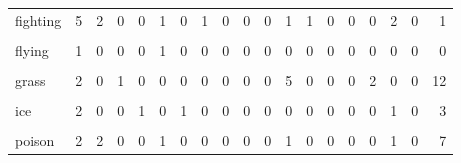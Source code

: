 \documentclass[
  12pt,
]{extreport}
\begin{document}
\begin{table}[H]
\begin{tabular}[t]{lrrrrrrrrrrrrrrrrrr}
\addlinespace
fighting & 5 & 2 & 0 & 0 & 1 & 0 & 1 & 0 & 0 & 0 & 1 & 1 & 0 & 0 & 0 & 2 & 0 & 1\\
\cellcolor{gray!10}{fire} & \cellcolor{gray!10}{1} & \cellcolor{gray!10}{0} & \cellcolor{gray!10}{0} & \cellcolor{gray!10}{1} & \cellcolor{gray!10}{1} & \cellcolor{gray!10}{0} & \cellcolor{gray!10}{2} & \cellcolor{gray!10}{1} & \cellcolor{gray!10}{0} & \cellcolor{gray!10}{0} & \cellcolor{gray!10}{1} & \cellcolor{gray!10}{0} & \cellcolor{gray!10}{0} & \cellcolor{gray!10}{0} & \cellcolor{gray!10}{0} & \cellcolor{gray!10}{0} & \cellcolor{gray!10}{0} & \cellcolor{gray!10}{13}\\
flying & 1 & 0 & 0 & 0 & 1 & 0 & 0 & 0 & 0 & 0 & 0 & 0 & 0 & 0 & 0 & 0 & 0 & 0\\
\cellcolor{gray!10}{ghost} & \cellcolor{gray!10}{1} & \cellcolor{gray!10}{0} & \cellcolor{gray!10}{0} & \cellcolor{gray!10}{0} & \cellcolor{gray!10}{1} & \cellcolor{gray!10}{0} & \cellcolor{gray!10}{0} & \cellcolor{gray!10}{0} & \cellcolor{gray!10}{0} & \cellcolor{gray!10}{0} & \cellcolor{gray!10}{1} & \cellcolor{gray!10}{0} & \cellcolor{gray!10}{0} & \cellcolor{gray!10}{0} & \cellcolor{gray!10}{0} & \cellcolor{gray!10}{0} & \cellcolor{gray!10}{0} & \cellcolor{gray!10}{2}\\
grass & 2 & 0 & 1 & 0 & 0 & 0 & 0 & 0 & 0 & 0 & 5 & 0 & 0 & 0 & 2 & 0 & 0 & 12\\
\addlinespace
\cellcolor{gray!10}{ground} & \cellcolor{gray!10}{1} & \cellcolor{gray!10}{2} & \cellcolor{gray!10}{0} & \cellcolor{gray!10}{0} & \cellcolor{gray!10}{0} & \cellcolor{gray!10}{0} & \cellcolor{gray!10}{1} & \cellcolor{gray!10}{0} & \cellcolor{gray!10}{0} & \cellcolor{gray!10}{0} & \cellcolor{gray!10}{0} & \cellcolor{gray!10}{0} & \cellcolor{gray!10}{0} & \cellcolor{gray!10}{0} & \cellcolor{gray!10}{0} & \cellcolor{gray!10}{3} & \cellcolor{gray!10}{0} & \cellcolor{gray!10}{0}\\
ice & 2 & 0 & 0 & 1 & 0 & 1 & 0 & 0 & 0 & 0 & 0 & 0 & 0 & 0 & 0 & 1 & 0 & 3\\
\cellcolor{gray!10}{normal} & \cellcolor{gray!10}{11} & \cellcolor{gray!10}{0} & \cellcolor{gray!10}{0} & \cellcolor{gray!10}{1} & \cellcolor{gray!10}{0} & \cellcolor{gray!10}{0} & \cellcolor{gray!10}{0} & \cellcolor{gray!10}{0} & \cellcolor{gray!10}{0} & \cellcolor{gray!10}{0} & \cellcolor{gray!10}{0} & \cellcolor{gray!10}{0} & \cellcolor{gray!10}{0} & \cellcolor{gray!10}{0} & \cellcolor{gray!10}{0} & \cellcolor{gray!10}{0} & \cellcolor{gray!10}{0} & \cellcolor{gray!10}{4}\\
poison & 2 & 2 & 0 & 0 & 1 & 0 & 0 & 0 & 0 & 0 & 1 & 0 & 0 & 0 & 0 & 1 & 0 & 7\\

\end{tabular}
\end{table}
\end{document}
